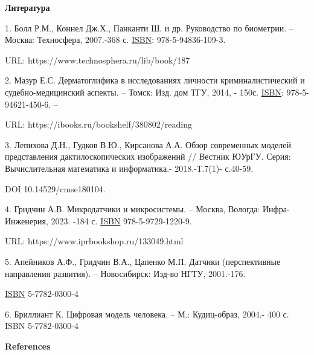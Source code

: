 \begin{center}
{\bfseries Литература}
\end{center}

\begin{references}
1. Болл Р.М., Коннел Дж.Х., Панканти Ш. и др. Руководство по биометрии.
-- Москва: Техносфера, 2007.-368 с.
\href{https://www.libex.ru/qna/ref/isbn/}{ISBN}: 978-5-94836-109-3.

URL: https://www.technosphera.ru/lib/book/187

2. Мазур Е.С. Дерматоглифика в исследованиях личности криминалистический
и судебно-медицин\-ский аспекты. -- Томск: Изд. дом ТГУ, 2014, - 150с.
\href{https://www.libex.ru/qna/ref/isbn/}{ISBN}: 978-5-94621-450-6. --

URL: https://ibooks.ru/bookshelf/380802/reading

3. Лепихова Д.Н., Гудков В.Ю., Кирсанова А.А. Обзор современных моделей
представления дактилоскопических изображений // Вестник ЮУрГУ. Серия:
Вычислительная математика и информатика.- 2018.-Т.7(1)- с.40-59.

DOI 10.14529/cmse180104.

4. Гридчин А.В. Микродатчики и микросистемы. -- Москва, Вологда:
Инфра-Инженерия, 2023. -184 с.
\href{https://www.libex.ru/qna/ref/isbn/}{ISBN} 978-5-9729-1220-9.

URL: https://www.iprbookshop.ru/133049.html

5. Апейников А.Ф., Гридчин В.А., Цапенко М.П. Датчики (перспективные
направления развития). -- Новосибирск: Изд-во НГТУ, 2001.-176.

\href{https://www.libex.ru/qna/ref/isbn/}{ISBN} 5-7782-0300-4

6. Бриллиант К. Цифровая модель человека. -- М.: Кудиц-образ, 2004.- 400
с. ISBN 5-7782-0300-4
\end{references}

\begin{center}
{\bfseries References}
\end{center}

